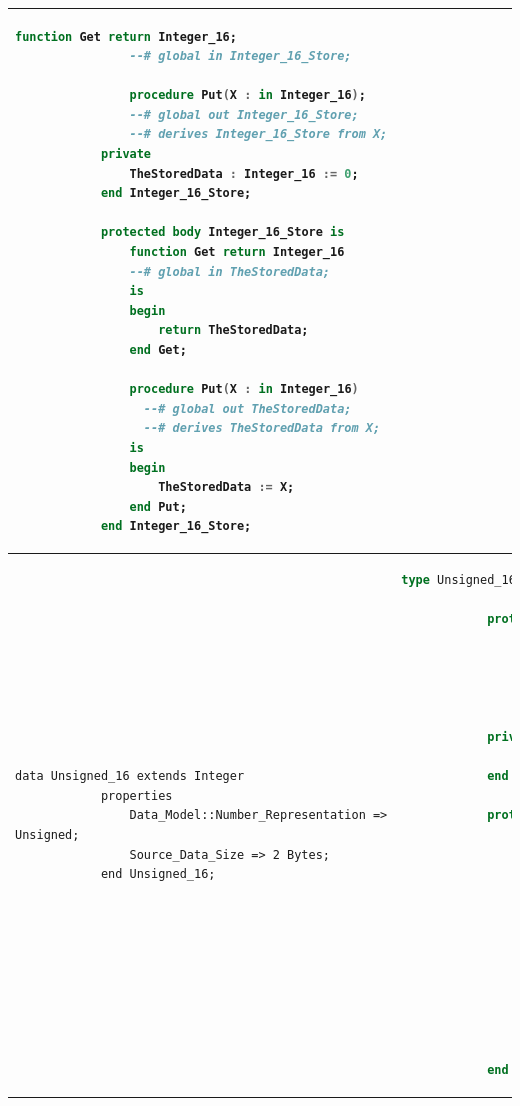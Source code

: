 \begin{center}
\begin{longtable}{| p{2in} | p{4in} |}
\begin{lstlisting}[language=ada]
		        function Get return Integer_16;
		        --# global in Integer_16_Store;

		        procedure Put(X : in Integer_16);
		        --# global out Integer_16_Store;
		        --# derives Integer_16_Store from X;
		    private
		        TheStoredData : Integer_16 := 0;
		    end Integer_16_Store;

		    protected body Integer_16_Store is
		        function Get return Integer_16
		        --# global in TheStoredData;
		        is
		        begin
		            return TheStoredData;
		        end Get;

		        procedure Put(X : in Integer_16)
		          --# global out TheStoredData;
		          --# derives TheStoredData from X;
		        is
		        begin
		            TheStoredData := X;
		        end Put;
		    end Integer_16_Store;
		\end{lstlisting} 

		\\ \hline

		\begin{lstlisting}[language=aadl]
			data Unsigned_16 extends Integer
			properties
				Data_Model::Number_Representation => Unsigned;
				Source_Data_Size => 2 Bytes;
			end Unsigned_16;
		\end{lstlisting} 
		&
		\begin{lstlisting}[language=ada]
			type Unsigned_16 is new Integer range 0 .. 2**(2*8-1);
    
		    protected type Unsigned_16_Store is pragma Priority (10);
			    function Get return Unsigned_16;
		        --# global in Unsigned_16_Store;
		        procedure Put(X : in Unsigned_16);
		        --# global out Unsigned_16_Store;
		        --# derives Unsigned_16_Store from X;
		    private
		        TheStoredData : Unsigned_16 := 0;
		    end Unsigned_16_Store;

		    protected body Unsigned_16_Store is
		        function Get return Unsigned_16
		        --# global in TheStoredData;
		        is begin 
		        	return TheStoredData; 
		        end Get;

		        procedure Put(X : in Unsigned_16)
		          --# global out TheStoredData;
		          --# derives TheStoredData from X;
		        is begin 
		        	TheStoredData := X; 
		        end Put;
		    end Unsigned_16_Store;
		\end{lstlisting}

		\\ \hline


\end{longtable}
\end{center}
